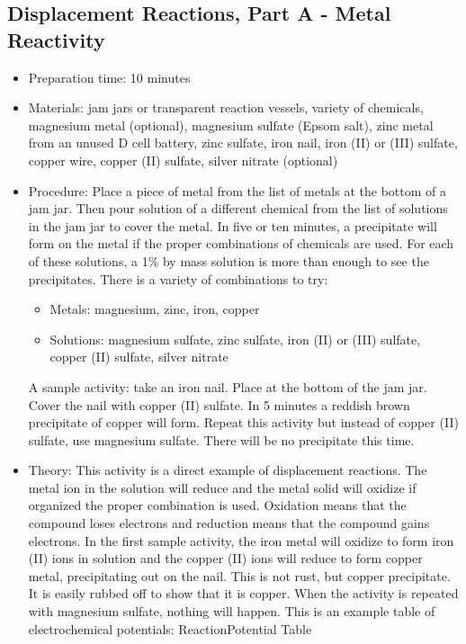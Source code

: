 \subsection{Displacement Reactions, Part A - Metal Reactivity}
\begin{itemize}
\item{Preparation time: 10 minutes}
\item{Materials: jam jars or transparent reaction vessels, variety of chemicals, magnesium metal (optional), magnesium sulfate (Epsom salt), zinc metal from an unused D cell battery, zinc sulfate, iron nail, iron (II) or (III) sulfate, copper wire, copper (II) sulfate, silver nitrate (optional)}
\item{Procedure: Place a piece of metal from the list of metals at the bottom of a jam jar. Then pour solution of a different chemical from the list of solutions in the jam jar to cover the metal. In five or ten minutes, a precipitate will form on the metal if the proper combinations of chemicals are used. For each of these solutions, a 1\% by mass solution is more than enough to see the precipitates. There is a variety of combinations to try:
\begin{itemize}
\item{Metals: magnesium, zinc, iron, copper}
\item{Solutions: magnesium sulfate, zinc sulfate, iron (II) or (III) sulfate, copper (II) sulfate, silver nitrate}
\end{itemize}
A sample activity: take an iron nail. Place at the bottom of the jam jar. Cover the nail with copper (II) sulfate. In 5 minutes a reddish brown precipitate of copper will form. Repeat this activity but instead of copper (II) sulfate, use magnesium sulfate. There will be no precipitate this time.}
\item{Theory: This activity is a direct example of displacement reactions. The metal ion in the solution will reduce and the metal solid will oxidize if organized the proper combination is used. Oxidation means that the compound loses electrons and reduction means that the compound gains electrons. In the first sample activity, the iron metal will oxidize to form iron (II) ions in solution and the copper (II) ions will reduce to form copper metal, precipitating out on the nail. This is not rust, but copper precipitate. It is easily rubbed off to show that it is copper. When the activity is repeated with magnesium sulfate, nothing will happen. This is an example table of electrochemical potentials: ReactionPotential Table\\
}
\end{itemize}
